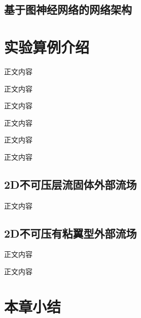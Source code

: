 \subsection{基于图神经网络的网络架构}

\section{实验算例介绍}
正文内容

正文内容

正文内容

正文内容

正文内容

正文内容

\subsection{2D不可压层流固体外部流场}
正文内容

\subsection{2D不可压有粘翼型外部流场}
正文内容

正文内容

\section{本章小结}
